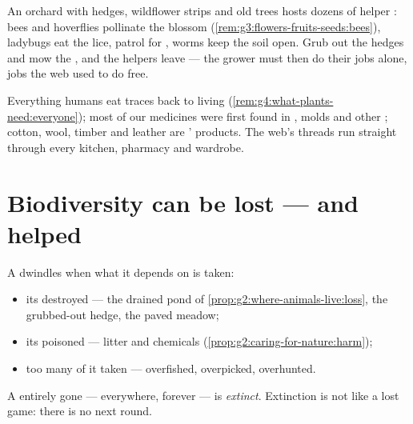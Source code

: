 \begin{example}\label{ex:g5:biodiversity:orchard}
An orchard with hedges, wildflower strips and old trees
hosts dozens of helper : bees and hoverflies
pollinate the blossom
(\cref{rem:g3:flowers-fruits-seeds:bees}), ladybugs eat the
 lice,  patrol for , worms keep the
soil open. Grub out the hedges and mow the , and the
helpers leave --- the  grower must then do their jobs
alone, jobs the web used to do free.
\end{example}

\begin{example}\label{ex:g5:biodiversity:people}
Everything humans eat traces back to living 
(\cref{rem:g4:what-plants-need:everyone}); most of our
medicines were first found in , molds and other ; cotton, wool, timber and leather are '
products. The web's threads run straight through every
kitchen, pharmacy and wardrobe.
\end{example}

\section{Biodiversity can be lost --- and helped}

\begin{proposition}\label{prop:g5:biodiversity:loss}
A  dwindles when what it depends on is taken:
\begin{itemize}
  \item its \emph{} destroyed --- the drained pond of
        \cref{prop:g2:where-animals-live:loss}, the grubbed-out
        hedge, the paved meadow;
  \item its  poisoned --- litter and chemicals
        (\cref{prop:g2:caring-for-nature:harm});
  \item too many of it taken --- overfished, overpicked,
        overhunted.
\end{itemize}
A  entirely gone --- everywhere, forever --- is
\emph{extinct}. Extinction is not like a lost
game: there is no next round.
\end{proposition}
\admitted

